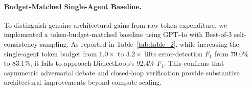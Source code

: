 \paragraph{Budget-Matched Single-Agent Baseline.}
To distinguish genuine architectural gains from raw token expenditure, we implemented a token-budget-matched baseline using GPT-4o with Best-of-3 self-consistency sampling. As reported in Table~\ref{tab:table_2}, while increasing the single-agent token budget from $1.0\times$ to $3.2\times$ lifts error-detection $F_1$ from 79.0\% to 83.1\%, it fails to approach DialectLoop's 92.4\% $F_1$. This confirms that asymmetric adversarial debate and closed-loop verification provide substantive architectural improvements beyond compute scaling.
